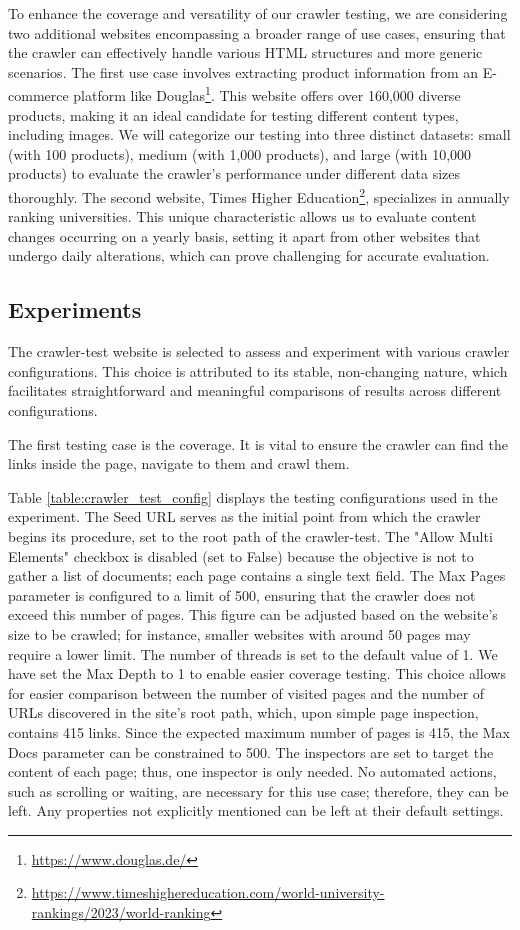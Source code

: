 {To enhance the coverage and versatility of our crawler testing, we are considering two additional websites encompassing a broader range of use cases, ensuring that the crawler can effectively handle various HTML structures and more generic scenarios.
The first use case involves extracting product information from an E-commerce platform like Douglas\footnote{\url{https://www.douglas.de/}}. This website offers over 160,000 diverse products, making it an ideal candidate for testing different content types, including images. We will categorize our testing into three distinct datasets: small (with 100 products), medium (with 1,000 products), and large (with 10,000 products) to evaluate the crawler's performance under different data sizes thoroughly.
The second website, Times Higher Education\footnote{\url{https://www.timeshighereducation.com/world-university-rankings/2023/world-ranking}}, specializes in annually ranking universities. This unique characteristic allows us to evaluate content changes occurring on a yearly basis, setting it apart from other websites that undergo daily alterations, which can prove challenging for accurate evaluation.

\subsection{Experiments}
The crawler-test website is selected to assess and experiment with various crawler configurations. This choice is attributed to its stable, non-changing nature, which facilitates straightforward and meaningful comparisons of results across different configurations.
 
The first testing case is the coverage. It is vital to ensure the crawler can find the links inside the page, navigate to them and crawl them. 

Table \ref{table:crawler_test_config} displays the testing configurations used in the experiment. The Seed URL serves as the initial point from which the crawler begins its procedure, set to the root path of the crawler-test. The "Allow Multi Elements" checkbox is disabled (set to False) because the objective is not to gather a list of documents; each page contains a single text field. The Max Pages parameter is configured to a limit of 500, ensuring that the crawler does not exceed this number of pages. This figure can be adjusted based on the website's size to be crawled; for instance, smaller websites with around 50 pages may require a lower limit. The number of threads is set to the default value of 1.
We have set the Max Depth to 1 to enable easier coverage testing. This choice allows for easier comparison between the number of visited pages and the number of URLs discovered in the site's root path, which, upon simple page inspection, contains 415 links. Since the expected maximum number of pages is 415, the Max Docs parameter can be constrained to 500.
The inspectors are set to target the content of each page; thus, one inspector is only needed. No automated actions, such as scrolling or waiting, are necessary for this use case; therefore, they can be left. Any properties not explicitly mentioned can be left at their default settings.

}
